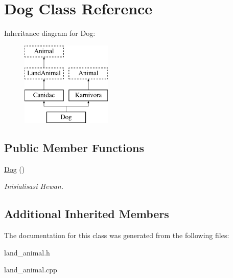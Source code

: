 \hypertarget{class_dog}{}\section{Dog Class Reference}
\label{class_dog}
Inheritance diagram for Dog\+:\begin{figure}[H]
\begin{center}
\leavevmode
\includegraphics[height=4.000000cm]{class_dog}
\end{center}
\end{figure}
\subsection*{Public Member Functions}
\begin{DoxyCompactItemize}
\item 
\hyperlink{class_dog_a16e01978bb90b2989ee3da3e87071b1b}{Dog} ()\hypertarget{class_dog_a16e01978bb90b2989ee3da3e87071b1b}{}\label{class_dog_a16e01978bb90b2989ee3da3e87071b1b}

\begin{DoxyCompactList}\small\item\em Inisialisasi Hewan. \end{DoxyCompactList}\end{DoxyCompactItemize}
\subsection*{Additional Inherited Members}


The documentation for this class was generated from the following files\+:\begin{DoxyCompactItemize}
\item 
land\+\_\+animal.\+h\item 
land\+\_\+animal.\+cpp\end{DoxyCompactItemize}
